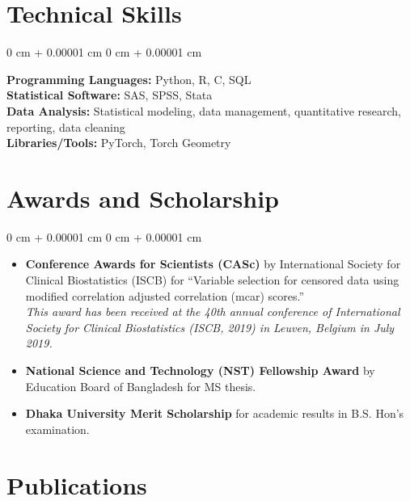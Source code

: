 \documentclass[10pt, letterpaper]{article}
\newenvironment{highlights}{
    \begin{itemize}[
        topsep=0.10 cm,
        parsep=0.10 cm,
        partopsep=0pt,
        itemsep=0pt,
        leftmargin=0 cm + 10pt
    ]
}{
    \end{itemize}
} %
\newenvironment{onecolentry}{
    \begin{adjustwidth}{
        0 cm + 0.00001 cm
    }{
        0 cm + 0.00001 cm
    }
}{
    \end{adjustwidth}
} %
\begin{document}
    \section{Technical Skills} 
        \begin{onecolentry}
            \textbf{Programming Languages:} Python, R, C, SQL\\
            \textbf{Statistical Software:} SAS, SPSS, Stata\\
            \textbf{Data Analysis:} Statistical modeling, data management, quantitative research, reporting, data cleaning\\
            \textbf{Libraries/Tools:} PyTorch, Torch Geometry
        \end{onecolentry}
        
    \section{Awards and Scholarship}
        \vspace{0.10 cm}
        \begin{onecolentry}
            \begin{highlights}
                \item \textbf{Conference Awards for Scientists (CASc)} by International Society for Clinical Biostatistics (ISCB) for “Variable selection for censored data using modified correlation adjusted correlation (mcar) scores.” \\
                \textit{This award has been received at the 40th annual conference of International Society for Clinical Biostatistics (ISCB, 2019) in Leuven, Belgium in July 2019.}
                \item \textbf{National Science and Technology (NST) Fellowship Award} by Education Board of Bangladesh for MS thesis.
                \item \textbf{Dhaka University Merit Scholarship} for academic results in B.S. Hon’s examination.
            \end{highlights}
        \end{onecolentry}


    \section{Publications}
        
\end{document}
